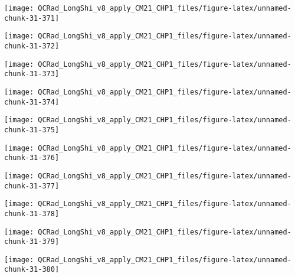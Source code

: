 \documentclass[
  10pt,
  a4paper,oneside]{article}
\begin{document}
\begin{center}\texttt{[image: QCRad\_LongShi\_v8\_apply\_CM21\_CHP1\_files/figure-latex/unnamed-chunk-31-371]} \end{center}

\begin{center}\texttt{[image: QCRad\_LongShi\_v8\_apply\_CM21\_CHP1\_files/figure-latex/unnamed-chunk-31-372]} \end{center}

\begin{center}\texttt{[image: QCRad\_LongShi\_v8\_apply\_CM21\_CHP1\_files/figure-latex/unnamed-chunk-31-373]} \end{center}

\begin{center}\texttt{[image: QCRad\_LongShi\_v8\_apply\_CM21\_CHP1\_files/figure-latex/unnamed-chunk-31-374]} \end{center}

\begin{center}\texttt{[image: QCRad\_LongShi\_v8\_apply\_CM21\_CHP1\_files/figure-latex/unnamed-chunk-31-375]} \end{center}

\begin{center}\texttt{[image: QCRad\_LongShi\_v8\_apply\_CM21\_CHP1\_files/figure-latex/unnamed-chunk-31-376]} \end{center}

\begin{center}\texttt{[image: QCRad\_LongShi\_v8\_apply\_CM21\_CHP1\_files/figure-latex/unnamed-chunk-31-377]} \end{center}

\begin{center}\texttt{[image: QCRad\_LongShi\_v8\_apply\_CM21\_CHP1\_files/figure-latex/unnamed-chunk-31-378]} \end{center}

\begin{center}\texttt{[image: QCRad\_LongShi\_v8\_apply\_CM21\_CHP1\_files/figure-latex/unnamed-chunk-31-379]} \end{center}

\begin{center}\texttt{[image: QCRad\_LongShi\_v8\_apply\_CM21\_CHP1\_files/figure-latex/unnamed-chunk-31-380]} \end{center}
\end{document}
